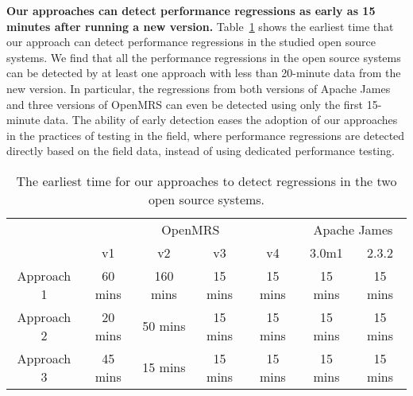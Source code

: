 \noindent\textbf{Our approaches can detect performance regressions as early as 15 minutes after running a new version.}
Table~\ref{tab:howearly} shows the earliest time that our approach can detect performance regressions in the studied open source systems. We find that all the performance regressions in the open source systems can be detected by at least one approach with less than 20-minute data from the new version. In particular, the regressions from both versions of Apache James and three versions of OpenMRS can even be detected using only the first 15-minute data. The ability of early detection eases the adoption of our approaches in the practices of testing in the field, where performance regressions are detected directly based on the field data, instead of using dedicated performance testing. 
 
\begin{table}[tbh]
  \centering
  \caption{The earliest time for our approaches to detect regressions in the two open source systems.}
    \begin{tabular}{c|cccc|cc}
    \hline
          & \multicolumn{4}{c|}{OpenMRS}  & \multicolumn{2}{c}{Apache James} \\
\cline{2-7}          & v1    & v2    & v3    & v4    & 3.0m1 & 2.3.2 \\
    \hline
    Approach 1 & 60 mins & 160 mins & 15 mins & 15 mins & 15 mins & 15 mins \\
    Approach 2 & 20 mins & 50 mins & 15 mins & 15 mins & 15 mins & 15 mins \\
    Approach 3 & 45 mins & 15 mins & 15 mins & 15 mins & 15 mins & 15 mins \\
    \hline
    \end{tabular}%
  \label{tab:howearly}%
\end{table}%








